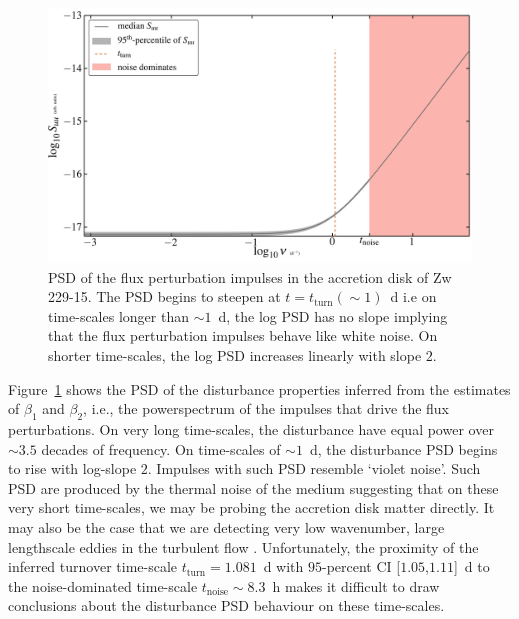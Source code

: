 \documentclass[a4paper,fleqn,usenatbib]{mnras}
\begin{document}
\begin{figure}
    \includegraphics[width=\columnwidth]{Figure6.jpg}
    \caption{PSD of the flux perturbation impulses in the accretion disk of Zw 229-15. The PSD begins to steepen at $t = t_{\mathrm{turn}} (\sim 1)$~d i.e on time-scales longer than $\sim 1$~d, the log PSD has no slope implying that the flux perturbation impulses behave like white noise. On shorter time-scales, the log PSD increases linearly with slope $2$.}
    \label{fig:Zw229-15_distPSD}
\end{figure}

Figure~\ref{fig:Zw229-15_distPSD} shows the PSD of the disturbance properties inferred from the estimates of $\beta_{1}$ and $\beta_{2}$, i.e., the powerspectrum of the impulses that drive the flux perturbations. On very long time-scales, the disturbance have equal power over $\sim 3.5$ decades of frequency. On time-scales of $\sim 1$~d, the disturbance PSD begins to rise with log-slope $2$. Impulses with such PSD resemble `violet noise'. Such PSD are produced by the thermal noise of the medium \citep{Mellen52} suggesting that on these very short time-scales, we may be probing the accretion disk matter directly. It may also be the case that we are detecting very low wavenumber, large lengthscale eddies in the turbulent flow \citep{EddySim15}. Unfortunately, the proximity of the inferred turnover time-scale $t_{\mathrm{turn}} = 1.081$~d with $95$-percent CI [$1.05$,$1.11$]~d to the noise-dominated time-scale $t_{\mathrm{noise}} \sim 8.3$~h makes it difficult to draw conclusions about the disturbance PSD behaviour on these time-scales.
\end{document}
